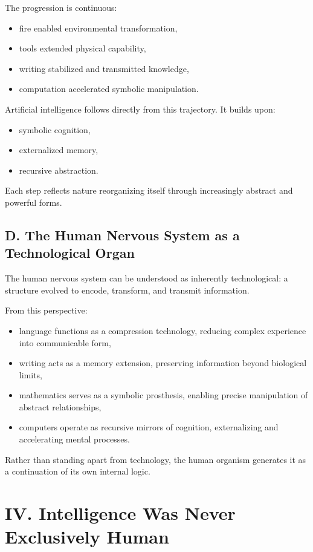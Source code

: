 \documentclass[12pt]{article}
\begin{document}
The progression is continuous:
\begin{itemize}
    \item fire enabled environmental transformation,
    \item tools extended physical capability,
    \item writing stabilized and transmitted knowledge,
    \item computation accelerated symbolic manipulation.
\end{itemize}

Artificial intelligence follows directly from this trajectory. It builds upon:
\begin{itemize}
    \item symbolic cognition,
    \item externalized memory,
    \item recursive abstraction.
\end{itemize}

Each step reflects nature reorganizing itself through increasingly abstract and powerful forms.

\subsection*{D. The Human Nervous System as a Technological Organ}

The human nervous system can be understood as inherently technological: a structure evolved to encode, transform, and transmit information.

From this perspective:
\begin{itemize}
    \item language functions as a compression technology, reducing complex experience into communicable form,
    \item writing acts as a memory extension, preserving information beyond biological limits,
    \item mathematics serves as a symbolic prosthesis, enabling precise manipulation of abstract relationships,
    \item computers operate as recursive mirrors of cognition, externalizing and accelerating mental processes.
\end{itemize}

Rather than standing apart from technology, the human organism generates it as a continuation of its own internal logic.


\section*{IV. Intelligence Was Never Exclusively Human}
\end{document}
